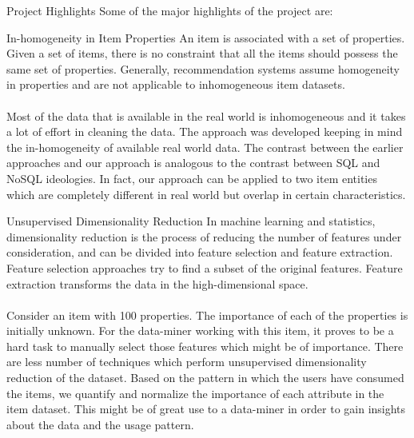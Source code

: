 \documentclass{report}
\begin{document}
\begin{projChapter}{Project Highlights}
        Some of the major highlights of the project are:
        \begin{projSection}{In-homogeneity in Item Properties}
            An item is associated with a set of properties. Given a set of items, there is no constraint that all the items should possess the same set of properties. Generally, recommendation systems assume homogeneity in properties and are not applicable to inhomogeneous item datasets. 
            ~\\\\
            Most of the data that is available in the real world is inhomogeneous and it takes a lot of effort in cleaning the data. The approach was developed keeping in mind the in-homogeneity of available real world data. The contrast between the earlier approaches and our approach is analogous to the contrast between SQL and NoSQL ideologies. In fact, our approach can be applied to two item entities which are completely different in real world but overlap in certain characteristics.
        \end{projSection}
\begin{projSection}{Unsupervised Dimensionality Reduction}
            In machine learning and statistics, dimensionality reduction is the process of reducing the number of features under consideration, and can be divided into feature selection and feature extraction. Feature selection approaches try to find a subset of the original features. Feature extraction transforms the data in the high-dimensional space. 
            ~\\\\
            Consider an item with 100 properties. The importance of each of the properties is initially unknown. For the data-miner working with this item, it proves to be a hard task to manually select those features which might be of importance. There are less number of techniques which perform unsupervised dimensionality reduction of the dataset. Based on the pattern in which the users have consumed the items, we quantify and normalize the importance of each attribute in the item dataset. This might be of great use to a data-miner in order to gain insights about the data and the usage pattern.
        \end{projSection}
\end{projChapter}
\end{document}
